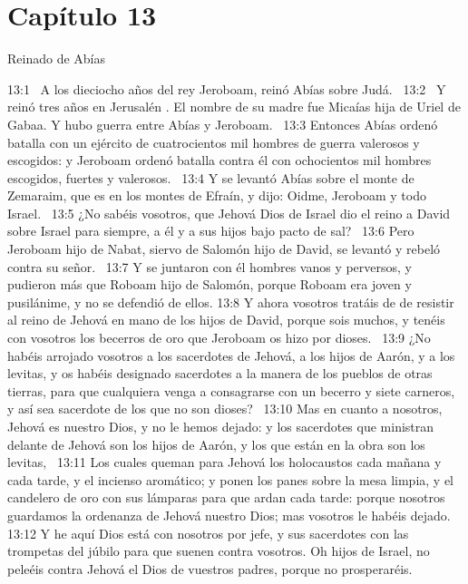 												\section*{Capítulo 13}
													Reinado de Abías  
													
													
													13:1  A los dieciocho años del rey Jeroboam, reinó Abías sobre Judá.  
													13:2  Y reinó tres años en Jerusalén . El nombre de su madre fue Micaías hija de Uriel de Gabaa. Y hubo guerra entre Abías y Jeroboam.  
													13:3 Entonces Abías ordenó batalla con un ejército de cuatrocientos mil hombres de guerra valerosos y escogidos: y Jeroboam ordenó batalla contra él con ochocientos mil hombres escogidos, fuertes y valerosos.  
													13:4 Y se levantó Abías sobre el monte de Zemaraim, que es en los montes de Efraín, y dijo: Oidme, Jeroboam y todo Israel.  
													13:5 ¿No sabéis vosotros, que Jehová Dios de Israel dio el reino a David sobre Israel para siempre, a él y a sus hijos bajo pacto de sal?  
													13:6 Pero Jeroboam hijo de Nabat, siervo de Salomón hijo de David, se levantó y rebeló contra su señor.  
													13:7 Y se juntaron con él hombres vanos y perversos, y pudieron más que Roboam hijo de Salomón, porque Roboam era joven y pusilánime, y no se defendió de ellos. 
													13:8 Y ahora vosotros tratáis de de resistir al reino de Jehová en mano de los hijos de David, porque sois muchos, y tenéis con vosotros los becerros de oro que Jeroboam os hizo por dioses.  
													13:9 ¿No habéis arrojado vosotros a los sacerdotes de Jehová, a los hijos de Aarón, y a los levitas, y os habéis designado sacerdotes a la manera de los pueblos de otras tierras, para que cualquiera venga a consagrarse con un becerro y siete carneros, y así sea sacerdote de los que no son dioses?  
													13:10 Mas en cuanto a nosotros, Jehová es nuestro Dios, y no le hemos dejado: y los sacerdotes que ministran delante de Jehová son los hijos de Aarón, y los que están en la obra son los levitas,  
													13:11 Los cuales queman para Jehová los holocaustos cada mañana y cada tarde, y el incienso aromático; y ponen los panes sobre la mesa limpia, y el candelero de oro con sus lámparas para que ardan cada tarde: porque nosotros guardamos la ordenanza de Jehová nuestro Dios; mas vosotros le habéis dejado.  
													13:12 Y he aquí Dios está con nosotros por jefe, y sus sacerdotes con las trompetas del júbilo para que suenen contra vosotros. Oh hijos de Israel, no peleéis contra Jehová el Dios de vuestros padres, porque no prosperaréis.  

